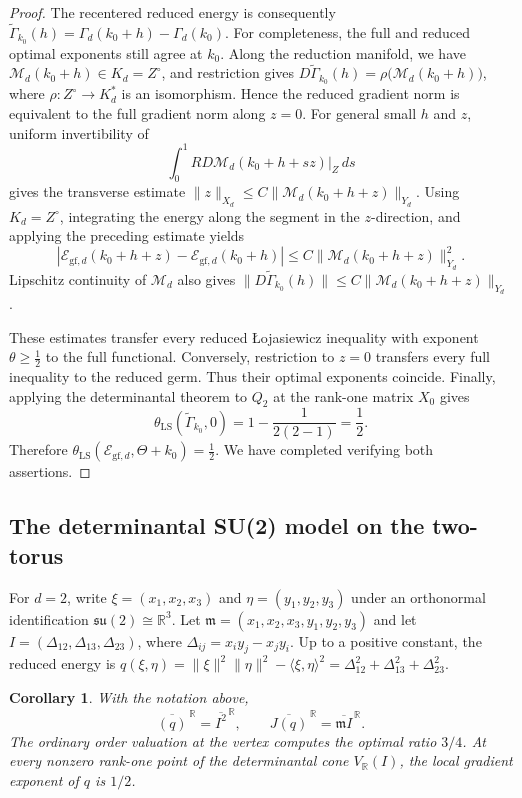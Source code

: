 \documentclass[11pt]{article}
\newtheorem{corollary}[theorem]{Corollary}
\theoremstyle{definition}
\theoremstyle{remark}
\begin{document}
\begin{proof}
\smallskip
The recentered reduced energy is consequently $\widetilde\Gamma_{k_0}(h)=\Gamma_d(k_0+h)-\Gamma_d(k_0)$.
For completeness, the full and reduced optimal exponents still agree at $k_0$. Along the reduction manifold, we have
$\mathcal M_d(k_0+h)\in K_d=Z^\circ$, and restriction gives
$D\widetilde\Gamma_{k_0}(h)=\rho\bigl(\mathcal M_d(k_0+h)\bigr)$,
where $\rho:Z^\circ\to K_d^*$ is an isomorphism. Hence the reduced gradient norm is equivalent to the full gradient norm along $z=0$.
For general small $h$ and $z$, uniform invertibility of
$$\int_0^1R D\mathcal M_d(k_0+h+sz)|_Z\,ds$$
gives the transverse estimate $\|z\|_{X_d}\le C\|\mathcal M_d(k_0+h+z)\|_{Y_d}$.
Using $K_d=Z^\circ$, integrating the energy along the segment in the $z$-direction, and applying the preceding estimate yields
$$\left| \mathcal E_{\mathrm{gf},d}(k_0+h+z) - \mathcal E_{\mathrm{gf},d}(k_0+h) \right| \le C\|\mathcal M_d(k_0+h+z)\|_{Y_d}^2.$$
Lipschitz continuity of $\mathcal M_d$ also gives $\|D\widetilde\Gamma_{k_0}(h)\|\le C\|\mathcal M_d(k_0+h+z)\|_{Y_d}$.

\smallskip
These estimates transfer every reduced Łojasiewicz inequality with exponent $\theta\ge\tfrac12$ to the full functional. Conversely, restriction to $z=0$ transfers every full inequality to the reduced germ. Thus their optimal exponents coincide.
Finally, applying the determinantal theorem to $Q_2$ at the rank-one matrix $X_0$ gives
$$\theta_{\mathrm{LS}}(\widetilde\Gamma_{k_0},0) =1-\frac{1}{2(2-1)}=\frac12.$$
Therefore $\theta_{\mathrm{LS}}(\mathcal E_{\mathrm{gf},d},\Theta+k_0)=\frac12$.
We have completed verifying both assertions. 
\end{proof}


\subsection{The determinantal SU(2) model on the two-torus}
\label{subsec:YM-Simon-pair}

For $d=2$, write $\xi=(x_1,x_2,x_3)$ and $\eta=(y_1,y_2,y_3)$ under an orthonormal identification $\mathfrak{su}(2)\cong\mathbb R^3$. Let
$\mathfrak m=(x_1,x_2,x_3,y_1,y_2,y_3)$ and let $I=(\Delta_{12},\Delta_{13},\Delta_{23})$, where $\Delta_{ij}=x_i y_j-x_j y_i$. Up to a positive constant, the reduced energy is
$q(\xi,\eta)=\|\xi\|^2\|\eta\|^2-\langle\xi,\eta\rangle^2=\Delta_{12}^2+\Delta_{13}^2+\Delta_{23}^2$.

\begin{corollary}\label{cor:YM-determinantal-Simon}
With the notation above,
$$
\overline{(q)}^{\,\mathbb R}=\overline{I^2}^{\,\mathbb R},
\qquad
\overline{J(q)}^{\,\mathbb R}=\overline{\mathfrak m I}^{\,\mathbb R}.
$$
The ordinary order valuation at the vertex computes the optimal ratio $3/4$. At every nonzero rank-one point of the determinantal cone $V_{\mathbb R}(I)$, the local gradient exponent of $q$ is $1/2$.
\end{corollary}
\end{document}
